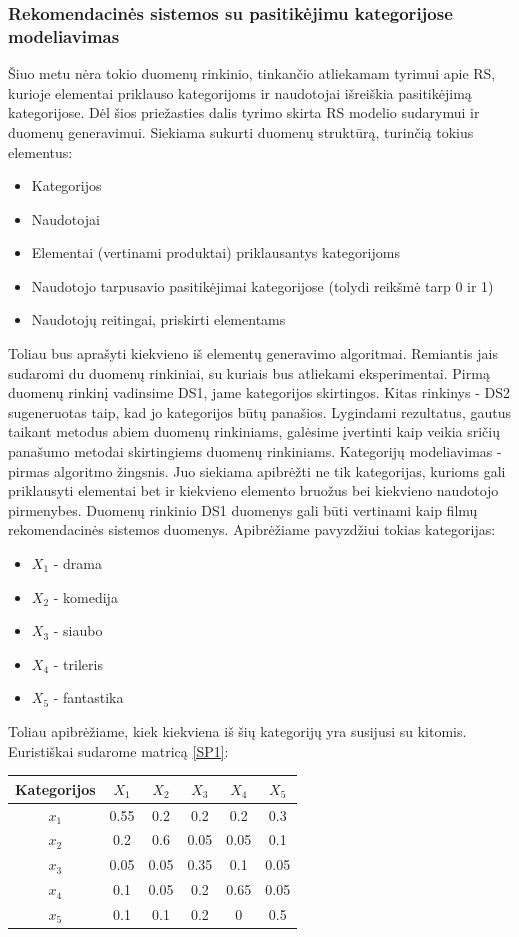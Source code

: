\documentclass{VUMIFInfMagistrinis}
\begin{document}
\subsubsection{Rekomendacinės sistemos su pasitikėjimu kategorijose modeliavimas}\label{DS1Gen}
\indent
Šiuo metu nėra tokio duomenų rinkinio, tinkančio atliekamam tyrimui apie RS, kurioje elementai priklauso kategorijoms ir naudotojai išreiškia pasitikėjimą kategorijose. Dėl šios priežasties dalis tyrimo skirta RS modelio sudarymui ir duomenų generavimui. Siekiama sukurti duomenų struktūrą, turinčią tokius elementus:
\begin{itemize}
	\item Kategorijos
	\item Naudotojai
	\item Elementai (vertinami produktai) priklausantys kategorijoms
	\item Naudotojo tarpusavio pasitikėjimai kategorijose (tolydi reikšmė tarp 0 ir 1)
	\item Naudotojų reitingai, priskirti elementams
\end{itemize}
\indent
Toliau bus aprašyti kiekvieno iš elementų generavimo algoritmai. Remiantis jais sudaromi du duomenų rinkiniai, su kuriais bus atliekami eksperimentai. Pirmą duomenų rinkinį vadinsime DS1, jame kategorijos skirtingos. Kitas rinkinys - DS2 sugeneruotas taip, kad jo kategorijos būtų panašios. Lygindami rezultatus, gautus taikant metodus abiem duomenų rinkiniams, galėsime įvertinti kaip veikia sričių panašumo metodai skirtingiems duomenų rinkiniams.
\indent
Kategorijų modeliavimas - pirmas algoritmo žingsnis. Juo siekiama apibrėžti ne tik kategorijas, kurioms gali priklausyti elementai bet ir kiekvieno elemento bruožus bei kiekvieno naudotojo pirmenybes. Duomenų rinkinio DS1 duomenys gali būti vertinami kaip filmų rekomendacinės sistemos duomenys. Apibrėžiame pavyzdžiui tokias kategorijas:
\begin{itemize}
	\item $X_1$ - drama
	\item $X_2$ - komedija
	\item $X_3$ - siaubo
	\item $X_4$ - trileris
	\item $X_5$ - fantastika
\end{itemize}
Toliau apibrėžiame, kiek kiekviena iš šių kategorijų yra susijusi su kitomis. Euristiškai sudarome matricą \ref{SP1}:
\begin{center}
	\begin{tabular}{||c c c c c c||} 
		\hline
		Kategorijos & $X_1$ & $X_2$ & $X_3$ & $X_4$ & $X_5$ \\ [0.5ex] 
		\hline\hline
		$x_1$ & 0.55 & 0.2 & 0.2 & 0.2 & 0.3 \\ 
		\hline
		$x_2$ & 0.2 & 0.6 & 0.05 & 0.05 & 0.1 \\
		\hline
		$x_3$ & 0.05 & 0.05 & 0.35 & 0.1 & 0.05 \\
		\hline
		$x_4$ & 0.1 & 0.05 & 0.2 & 0.65 & 0.05 \\
		\hline
		$x_5$ & 0.1 & 0.1 & 0.2 & 0 & 0.5 \\ [1ex] 
		\hline
	\end{tabular}\label{SP1}
\end{center}
\end{document}
